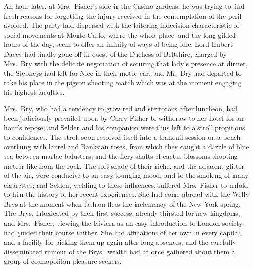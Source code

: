\documentclass[12pt,a4paper]{book}
\begin{document}
An hour later, at Mrs.\ Fisher's side in the Casino gardens, he
was trying to find fresh reasons for forgetting the injury
received in the contemplation of the peril avoided. The party had
dispersed with the loitering indecision characteristic of social
movements at Monte Carlo, where the whole place, and the long
gilded hours of the day, seem to offer an infinity of ways of
being idle. Lord Hubert Dacey had finally gone off in quest of
the Duchess of Beltshire, charged by Mrs.\ Bry with the delicate
negotiation of securing that lady's presence at dinner, the
Stepneys had left for Nice in their motor-car, and Mr.\ Bry had
departed to take his place in the pigeon shooting match which was
at the moment engaging his highest faculties.





Mrs.\ Bry, who had a tendency to grow red and stertorous after
luncheon, had been judiciously prevailed upon by Carry
Fisher to withdraw to her hotel for an hour's repose; and Selden
and his companion were thus left to a stroll propitious to
confidences. The stroll soon resolved itself into a tranquil
session on a bench overhung with laurel and Banksian roses, from
which they caught a dazzle of blue sea between marble balusters,
and the fiery shafts of cactus-blossoms shooting meteor-like from
the rock. The soft shade of their niche, and the adjacent glitter
of the air, were conducive to an easy lounging mood, and to the
smoking of many cigarettes; and Selden, yielding to these
influences, suffered Mrs.\ Fisher to unfold to him the history of
her recent experiences. She had come abroad with the Welly Brys
at the moment when fashion flees the inclemency of the New York
spring. The Brys, intoxicated by their first success, already
thirsted for new kingdoms, and Mrs.\ Fisher, viewing the Riviera
as an easy introduction to London society, had guided their
course thither. She had affiliations of her own in every capital,
and a facility for picking them up again after long absences; and
the carefully disseminated rumour of the Brys'\ wealth had at once
gathered about them a group of cosmopolitan pleasure-seekers.
\end{document}

